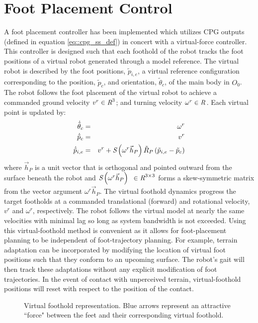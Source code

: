 	\section{Foot Placement Control}


		A foot placement controller has been implemented which utilizes CPG outputs (defined in equation \ref{eq::cpg_ss_def}) in concert with a virtual-force controller. This controller is designed such that each foothold of the robot tracks the foot positions of a virtual robot generated through a model reference. The virtual robot is described by the foot positions, $\tilde{p}_{i,e}$, a virtual reference configuration corresponding to the position, $\tilde{p}_{c}$, and orientation, $\tilde{\theta}_{c}$, of the main body in $O_{0}$. The robot follows the foot placement of the virtual robot to achieve a commanded ground velocity $v^{r} \in\emph{R}^{3} $; and turning velocity $\omega^{r} \in\emph{R}^{}$. Each virtual point is updated by:
		\begin{eqnarray}
			\dot{\tilde{\theta}}_{c}	& = & \omega^{r} 	\nonumber\\
			\dot{\tilde{p}}_{c}			& = & v^{r}			\nonumber\\
			\dot{\tilde{p}}_{i,e} 		& = & v^{r} + \emph{S}\left(\omega^{r}\vec{h}_P\right) \tilde{R}_{P} \left(\tilde{p}_{i,e}-\tilde{p}_{c} \right) 
			\label{eq::virtual_foothold_control}
		\end{eqnarray}
		where $\vec{h}_P$ is a unit vector that is orthogonal and pointed outward from the surface beneath the robot and $\emph{S}\left(\omega^{r}\vec{h}_P\right)\text{ }\in \emph{R}^{3\times3}$ forms a skew-symmetric matrix from the vector argument $\omega^{r}\vec{h}_P$. The virtual foothold dynamics progress the target footholds at a commanded translational (forward) and rotational velocity, $v^{r}$ and $\omega^{r}$, respectively. The robot follows the virtual model at nearly the same velocities with minimal lag so long as system bandwidth is not exceeded. Using this virtual-foothold method is convenient as it allows for foot-placement planning to be independent of foot-trajectory planning. For example, terrain adaptation can be incorporated by modifying the location of virtual foot positions such that they conform to an upcoming surface. The robot's gait will then track these adaptations without any explicit modification of foot trajectories. In the event of contact with unperceived terrain, virtual-foothold positions will reset with respect to the position of the contact.
%
			\begin{figure}[h!]
				\centering
				\caption{ Virtual foothold representation. Blue arrows represent an attractive ``force" between the feet and their corresponding virtual foothold.}
				\label{fig::virtial_foothold}
			\end{figure}
